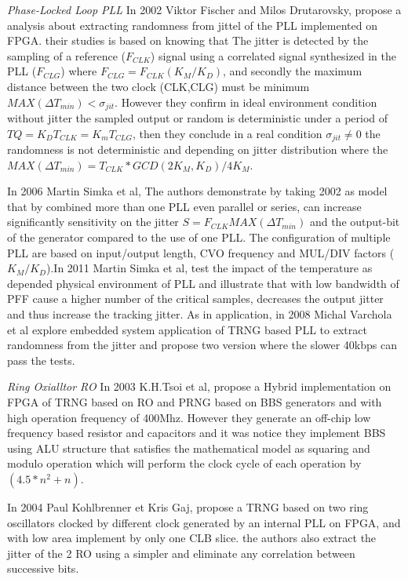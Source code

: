 \textit{Phase-Locked Loop PLL}
In 2002 Viktor Fischer and Milos Drutarovsky, propose a analysis about extracting randomness from jittel of the PLL implemented on FPGA. their studies is based on knowing that The jitter is detected by the sampling of a reference ($F_{CLK}$) signal using a correlated signal synthesized in the PLL ($F_{CLG}$) where $F_{CLG}=F_{CLK}(K_{M}/K_{D})$, and secondly the maximum distance between the two clock (CLK,CLG) must be minimum $MAX(\Delta T_{min}) < \sigma_{jit}$. However they confirm in ideal environment condition without jitter the sampled output or random is deterministic under a period of $T{Q}={K_{D}T_{CLK}}={K_{m}T_{CLG}}$, then they conclude in a real condition $\sigma_{jit} \neq 0 $ the randomness is not deterministic and depending on jitter distribution where the $MAX(\Delta T_{min})= T_{CLK}*GCD(2K_{M},K_{D})/4K_{M}$.  

In 2006 Martin Simka et al, The authors demonstrate by taking 2002 as model that by combined more than one PLL even parallel or series, can increase significantly sensitivity on the jitter $S=F_{CLK}MAX(\Delta T_{min})$ and the output-bit of the generator compared to the use of one PLL. The configuration of multiple PLL are based on input/output length, CVO frequency and MUL/DIV factors ($K_{M}/K_{D}$).In 2011 Martin Simka et al, test the impact of the temperature as depended physical environment of PLL and illustrate that with low bandwidth of PFF cause a higher number of the critical samples, decreases the output jitter and thus increase the tracking jitter. As in application, in 2008 Michal Varchola et al explore embedded system application of TRNG based PLL to extract randomness from the jitter and propose two version where the slower 40kbps can pass the tests.

\textit{Ring Oxialltor RO}
In 2003 K.H.Tsoi et al, propose a Hybrid implementation on FPGA of TRNG based on RO and PRNG based on BBS generators and with high operation frequency of 400Mhz. However they generate an off-chip low frequency based resistor and capacitors and it was notice they implement BBS using ALU structure that satisfies the mathematical model as squaring and modulo operation which will perform the clock cycle of each operation by $(4.5*n^{2} + n)$.

In 2004 Paul Kohlbrenner et Kris Gaj, propose a TRNG based on two ring oscillators clocked by different clock generated by an internal PLL on FPGA, and with low area implement by only one CLB slice. the authors also extract the jitter of the 2 RO using a simpler and eliminate any correlation between successive bits.

